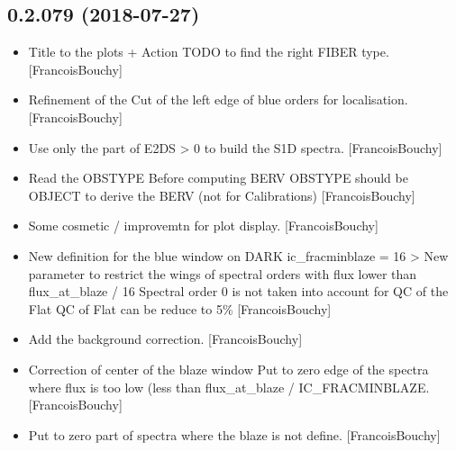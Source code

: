 \documentclass[a4paper,10pt,english]{report}
\begin{document}
\subsection{0.2.079 (2018-07-27)}
\label{\detokenize{misc/changelog:id382}}\begin{itemize}
\item {} 
Title to the plots + Action TODO to find the right FIBER type.
{[}FrancoisBouchy{]}

\item {} 
Refinement of the Cut of the left edge of blue orders for
localisation. {[}FrancoisBouchy{]}

\item {} 
Use only the part of E2DS \textgreater{} 0 to build the S1D spectra.
{[}FrancoisBouchy{]}

\item {} 
Read the OBSTYPE Before computing BERV OBSTYPE should be OBJECT to
derive the BERV (not for Calibrations) {[}FrancoisBouchy{]}

\item {} 
Some cosmetic / improvemtn for plot display. {[}FrancoisBouchy{]}

\item {} 
New definition for the blue window on DARK ic\_fracminblaze = 16 \textendash{}\textgreater{}
New parameter to restrict the wings of spectral orders with flux lower
than flux\_at\_blaze / 16 Spectral order 0 is not taken into account for
QC of the Flat QC of Flat can be reduce to 5\% {[}FrancoisBouchy{]}

\item {} 
Add the background correction. {[}FrancoisBouchy{]}

\item {} 
Correction of center of the blaze window Put to zero edge of the
spectra where flux is too low (less than flux\_at\_blaze /
IC\_FRACMINBLAZE. {[}FrancoisBouchy{]}

\item {} 
Put to zero part of spectra where the blaze is not define.
{[}FrancoisBouchy{]}

\end{itemize}
\end{document}
